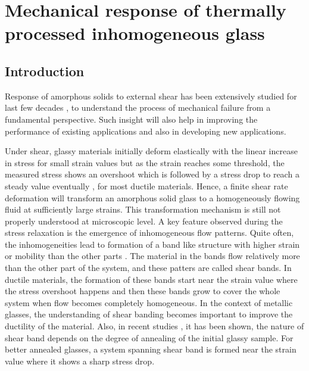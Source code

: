 \pagestyle{fancy}
\fancyhf{}
\renewcommand{\headrulewidth}{0pt}
\fancyfoot[C]{\leftmark}
\fancyhead[R]{\thepage}
\doublespacing
\chapter{Mechanical response of thermally processed inhomogeneous glass}\label{chap4}

\section{Introduction}

Response of amorphous solids to external shear has been extensively studied for last few decades \cite{nicolas2018deformation,ludovicRMP2017,larson}, to understand the process of mechanical failure from a fundamental perspective. Such insight will also help in improving the performance of existing applications and also in developing new applications. 

Under shear, glassy materials initially deform elastically with the linear increase in stress for small strain values but as the strain reaches some threshold, the measured stress shows an overshoot which is followed by a stress drop to reach a steady value eventually \cite{falkLanger98,gauravJRheo15,gauravPRE15}, for most ductile materials. Hence, a finite shear rate deformation will transform an amorphous solid glass to a homogeneously flowing fluid at sufficiently large strains. This transformation mechanism is still not properly understood at microscopic level. A key feature observed during the stress relaxation is the emergence of inhomogeneous flow patterns. Quite often, the inhomogeneities lead to formation of a band like structure with higher strain or mobility than the other parts \cite{golkia2020}. The material in the bands flow relatively more than the other part of the system, and these patters are called shear bands. In ductile materials, the formation of these bands start near the strain value where the stress overshoot happens and then these bands grow to cover the whole system when flow becomes completely homogeneous. In the context of metallic glasses, the understanding of shear banding becomes important to improve the ductility of the material. Also, in recent studies \cite{ozawa2018random,ozawa2020role}, it has been shown, the nature of shear band depends on the degree of annealing of the initial glassy sample. For better annealed glasses, a system spanning shear band is formed near the strain value where it shows a sharp stress drop.  

